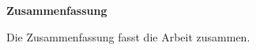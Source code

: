 
\clearemptydoublepage
{}
{}

\vspace*{1cm}
\begin{center}
{\Large \bf Zusammenfassung}
\end{center}
\vspace{1cm}

Die Zusammenfassung fasst die Arbeit zusammen.


